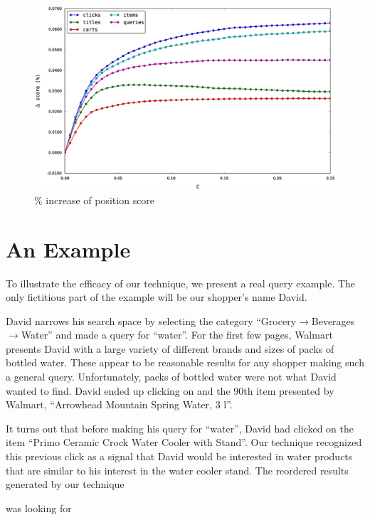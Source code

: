 \documentclass{article}
\begin{document}
\begin{figure}[htbp!]
\centering
\includegraphics[width=\textwidth]{000050_0.48chunk.k100.i2.n100.percent_increase_position_score.0-0.25.eps}
\caption{\% increase of position score}
    \label{fig:percent_increase_of_position_score}
\end{figure}

\section{An Example}

To illustrate the efficacy of our technique, we present a real query example.
The only fictitious part of the example will be our shopper's name David.

David narrows his search space by selecting the category
``Grocery$\rightarrow$Beverages$\rightarrow$Water'' and made a query for
``water''. For the first few pages, Walmart presents David with a large
variety of different brands and sizes of packs of bottled water. These appear to
be reasonable results for any shopper making such a general query.
Unfortunately, packs of bottled water were not what David wanted to find. David
ended up clicking on and the 90th item presented by Walmart, ``Arrowhead
Mountain Spring Water, 3 l''. %

It turns out that before making his query for ``water'', David had clicked on
the item ``Primo Ceramic Crock Water Cooler with Stand''. %
Our technique recognized this previous click as a signal that David would be
interested in water products that are similar to his interest in the water
cooler stand. The reordered results generated by our technique 

was looking for 
\end{document}

